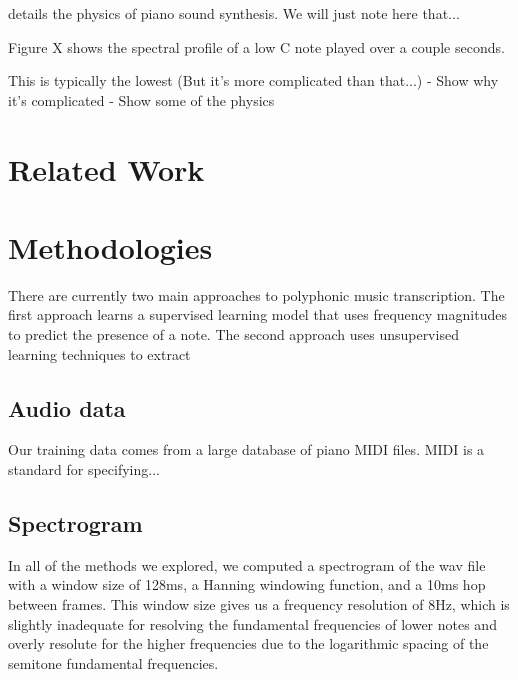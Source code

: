 \documentclass[5p]{elsarticle}
\begin{document}
\citet{bank2003physically} details the physics of piano sound synthesis. We will just note here that...


Figure X shows the spectral profile of a low C note played over a couple seconds. 

This is typically the lowest 
(But it's more complicated than that...)
- Show why it's complicated 
- Show some of the physics 


\section{Related Work}


\section{Methodologies}
There are currently two main approaches to polyphonic music transcription. The first approach learns a supervised learning model that uses frequency magnitudes to predict the presence of a note. The second approach uses unsupervised learning techniques to extract

\subsection{Audio data}

Our training data comes from a large database of piano MIDI files. MIDI is a standard for specifying...





\subsection{Spectrogram}

In all of the methods we explored, we computed a spectrogram of the wav file with a window size of 128ms, a Hanning windowing function, and a 10ms hop between frames. This window size gives us a frequency resolution of 8Hz, which is slightly inadequate for resolving the fundamental frequencies of lower notes and overly resolute for the higher frequencies due to the logarithmic spacing of the semitone fundamental frequencies. 
\end{document}
